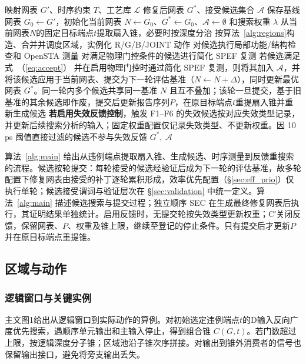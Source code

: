 \documentclass[twocolumn,10pt,fontset=windows]{ctexart}
\renewcommand{\eqref}[1]{\textup{（\ref{#1}）}}
\begin{document}
\begin{algorithm}[H]
\footnotesize
\caption{FAECO 修复流程示意}\label{alg:main}
\begin{algorithmic}[1]
\Require 映射网表 $G'$、时序约束 $T$、工艺库 $\mathcal{L}$
\Ensure 修复后网表 $G^*$、接受候选集合 $\mathcal{A}$
\State 保存基线网表 $G_0\gets G'$，初始化当前网表 $N\gets G_0$、$G^*\gets G_0$、$\mathcal{A}\gets\emptyset$ 和搜索权重 $\lambda$
\Repeat
  \State 从当前网表$N$的固定目标端点$t$提取扇入锥，必要时按深度分治
  \State 按算法~\ref{alg:regions}构造、合并并调度区域，实例化 R/G/B/JOINT 动作
  \State 对候选执行局部功能/结构检查和 OpenSTA 测量
  \State 对满足物理门控条件的候选进行简化 SPEF 复测
  \State 若候选满足式~\eqref{eq:accept} 并在启用物理门控时通过简化 SPEF 复测，则将其加入 $\mathcal{A}$，并将该候选应用于当前网表、提交为下一轮评估基准（$N\gets N+\Delta$），同时更新最优网表 $G^*$。同一轮内多个候选共享同一基准 $N$ 且互不叠加；该轮一旦提交，基于旧基准的其余候选即作废，提交后更新报告序列$P$，在原目标端点$t$重提扇入锥并重新生成候选
  \State \textbf{若启用失效反馈控制}，触发 F1--F6 的失效候选按对应失效类型记录，并更新后续搜索分析的输入；固定权重配置仅记录失效类型、不更新权重。因 10\,ps 阈值直接过滤的候选不参与失效反馈
\State \Return $G^*,\ \mathcal{A}$
\end{algorithmic}
\end{algorithm}

算法~\ref{alg:main} 给出从违例端点提取扇入锥、生成候选、时序测量到反馈重搜索的流程。候选按轮提交：每轮接受的候选经验证后成为下一轮的评估基准，故多轮配置下修复网表由接受的补丁逐轮累积形成，效率优先配置（\S\ref{sec:eff_prio}）仅执行单轮；候选接受谓词与验证层次在 \S\ref{sec:validation} 中统一定义。算法~\ref{alg:main} 描述候选搜索与提交过程；独立顺序 SEC 在生成最终修复网表后执行，其证明结果单独统计。启用反馈时，无提交轮按失效类型更新权重；C′关闭反馈，保留网表、$P$、权重及锥上限，继续至登记的停止条件。只有提交后才更新$P$并在原目标端点重提锥。

\subsection{区域与动作}\label{sec:mechanism}
\subsubsection{逻辑窗口与关键实例}
主文图1给出从逻辑窗口到实际动作的算例。对初始选定违例端点$t$的D输入反向广度优先搜索，遇顺序单元输出和主输入停止，得到组合锥 $C(G,t)$。若门数超过上限，按逻辑深度分子锥；区域池沿子锥次序拼接。对输出到锥外消费者的信号也保留输出接口，避免将旁支输出丢失。
\end{document}
